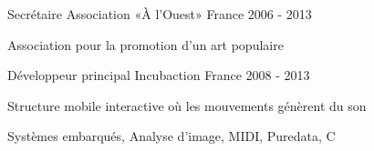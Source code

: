 

\begin{cventries}

  \cventry
    {Secrétaire} %
    {Association «À l'Ouest»} %
    {France} %
    {2006 - 2013} %
    {
      \begin{cvitems} %
        \item {Association pour la promotion d'un art populaire}
      \end{cvitems}
    }

  \cventry
    {Développeur principal} %
    {Incubaction} %
    {France} %
    {2008 - 2013} %
    {
      \begin{cvitems} %
        \item {Structure mobile interactive où les mouvements génèrent du son}
	\item {Systèmes embarqués, Analyse d'image, MIDI, Puredata, C}
      \end{cvitems}
    }

\end{cventries}
